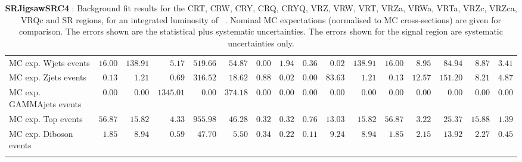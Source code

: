 \begin{table}
{\begin{tabular*}{\textwidth}{@{\extracolsep{\fill}}lrrrrrrrrrrrrrrr}
        MC exp. Wjets events         & $16.00$          & $138.91$          & $5.17$          & $519.66$          & $54.87$          & $0.00$          & $1.94$          & $0.36$          & $0.02$          & $138.91$          & $16.00$          & $8.95$          & $84.94$          & $8.87$          & $3.41$              \\
        MC exp. Zjets events         & $0.13$          & $1.21$          & $0.69$          & $316.52$          & $18.62$          & $0.88$          & $0.02$          & $0.00$          & $83.63$          & $1.21$          & $0.13$          & $12.57$          & $151.20$          & $8.21$          & $4.87$              \\
        MC exp. GAMMAjets events         & $0.00$          & $0.00$          & $1345.01$          & $0.00$          & $374.18$          & $0.00$          & $0.00$          & $0.00$          & $0.00$          & $0.00$          & $0.00$          & $0.00$          & $0.00$          & $0.00$          & $0.00$              \\
        MC exp. Top events         & $56.87$          & $15.82$          & $4.33$          & $955.98$          & $46.28$          & $0.32$          & $0.32$          & $0.76$          & $13.03$          & $15.82$          & $56.87$          & $3.22$          & $25.37$          & $15.88$          & $1.39$              \\
        MC exp. Diboson events         & $1.85$          & $8.94$          & $0.59$          & $47.70$          & $5.50$          & $0.34$          & $0.22$          & $0.11$          & $9.24$          & $8.94$          & $1.85$          & $2.15$          & $13.92$          & $2.27$          & $0.45$              \\
\noalign{\smallskip}\hline\noalign{\smallskip}
\end{tabular*}
}
\caption{{\bf SRJigsawSRC4} : Background fit results for the CRT, CRW, CRY, CRQ, CRYQ, VRZ, VRW, VRT, VRZa, VRWa, VRTa, VRZc, VRZca, VRQc and SR regions, for an integrated luminosity of \ourintlumi~\ifb. Nominal MC expectations (normalised to MC cross-sections) are given for comparison. The errors shown are the statistical plus systematic uncertainties. The errors shown for the signal region are systematic uncertainties only.}
\label{table.results.systematics.in.logL.fit.CRT.CRW.CRY.CRQ.CRYQ.VRZ.VRW.VRT.VRZa.VRWa.VRTa.VRZc.VRZca.VRQc.SR.SRJigsawSRC4}
\end{table}
%